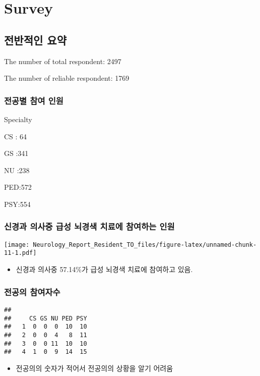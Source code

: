 \documentclass[]{book}
\providecommand{\tightlist}{%
  \setlength{\itemsep}{0pt}\setlength{\parskip}{0pt}}
\begin{document}
\hypertarget{survey}{%
\chapter{Survey}\label{survey}}

\hypertarget{section-13}{%
\section{전반적인 요약}\label{section-13}}

The number of total respondent: 2497

The number of reliable respondent: 1769

\hypertarget{section-14}{%
\subsection{전공별 참여 인원}\label{section-14}}

Specialty

CS : 64

GS :341

NU :238

PED:572

PSY:554

\hypertarget{section-15}{%
\subsection{신경과 의사중 급성 뇌경색 치료에 참여하는 인원}\label{section-15}}

\texttt{[image: Neurology\_Report\_Resident\_TO\_files/figure-latex/unnamed-chunk-11-1.pdf]}

\begin{itemize}
\tightlist
\item
  신경과 의사중 57.14\%가 급성 뇌경색 치료에 참여하고 있음.
\end{itemize}

\hypertarget{section-16}{%
\subsection{전공의 참여자수}\label{section-16}}

\begin{verbatim}
##    
##     CS GS NU PED PSY
##   1  0  0  0  10  10
##   2  0  0  4   8  11
##   3  0  0 11  10  10
##   4  1  0  9  14  15
\end{verbatim}

\begin{itemize}
\tightlist
\item
  전공의의 숫자가 적어서 전공의의 상황을 알기 어려움
\end{itemize}
\end{document}
